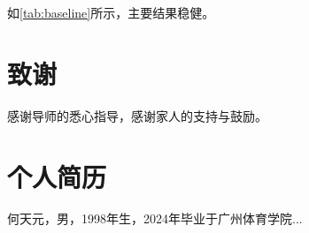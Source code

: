 \documentclass[
  degree=master,
  degreetype=profession,
  bibtype=numeric
]{gzsu_thesis}
\begin{document}
如\cref{tab:baseline}所示，主要结果稳健。

\backmatter

\printbibliography[heading=bibintoc, title={参考文献}]

\chapter*{致谢}

感谢导师的悉心指导，感谢家人的支持与鼓励。

\chapter*{个人简历}

何天元，男，1998年生，2024年毕业于广州体育学院...
\end{document}
